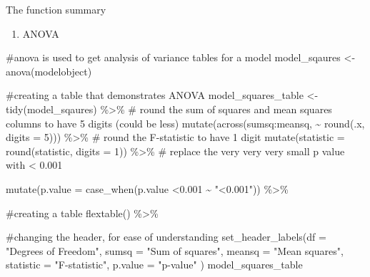 \documentclass[
  letterpaper,
  DIV=11,
  numbers=noendperiod]{scrartcl}
\newenvironment{Shaded}{\begin{snugshade}}{\end{snugshade}}
\newcommand{\AttributeTok}[1]{\textcolor[rgb]{0.40,0.45,0.13}{#1}}
\newcommand{\CommentTok}[1]{\textcolor[rgb]{0.37,0.37,0.37}{#1}}
\newcommand{\DecValTok}[1]{\textcolor[rgb]{0.68,0.00,0.00}{#1}}
\newcommand{\FloatTok}[1]{\textcolor[rgb]{0.68,0.00,0.00}{#1}}
\newcommand{\FunctionTok}[1]{\textcolor[rgb]{0.28,0.35,0.67}{#1}}
\newcommand{\NormalTok}[1]{\textcolor[rgb]{0.00,0.23,0.31}{#1}}
\newcommand{\OtherTok}[1]{\textcolor[rgb]{0.00,0.23,0.31}{#1}}
\newcommand{\SpecialCharTok}[1]{\textcolor[rgb]{0.37,0.37,0.37}{#1}}
\newcommand{\StringTok}[1]{\textcolor[rgb]{0.13,0.47,0.30}{#1}}
\providecommand{\tightlist}{%
  \setlength{\itemsep}{0pt}\setlength{\parskip}{0pt}}\usepackage{longtable,booktabs,array}
\begin{document}
The function summary

\begin{enumerate}
\def\labelenumi{\arabic{enumi}.}
\setcounter{enumi}{6}
\tightlist
\item
  ANOVA
\end{enumerate}

\begin{Shaded}
\begin{Highlighting}[]
\CommentTok{\#anova is used to get analysis of variance tables for a model }
\NormalTok{model\_sqaures }\OtherTok{\textless{}{-}} \FunctionTok{anova}\NormalTok{(modelobject)}
\end{Highlighting}
\end{Shaded}

\begin{Shaded}
\begin{Highlighting}[]
\CommentTok{\#creating a table that demonstrates ANOVA}
\NormalTok{model\_squares\_table }\OtherTok{\textless{}{-}}\FunctionTok{tidy}\NormalTok{(model\_sqaures) }\SpecialCharTok{\%\textgreater{}\%} 
  \CommentTok{\# round the sum of squares and mean squares columns to have 5 digits (could be less)}
  \FunctionTok{mutate}\NormalTok{(}\FunctionTok{across}\NormalTok{(sumsq}\SpecialCharTok{:}\NormalTok{meansq, }\SpecialCharTok{\textasciitilde{}} \FunctionTok{round}\NormalTok{(.x, }\AttributeTok{digits =} \DecValTok{5}\NormalTok{))) }\SpecialCharTok{\%\textgreater{}\%} 
  \CommentTok{\# round the F{-}statistic to have 1 digit}
  \FunctionTok{mutate}\NormalTok{(}\AttributeTok{statistic =} \FunctionTok{round}\NormalTok{(statistic, }\AttributeTok{digits =} \DecValTok{1}\NormalTok{)) }\SpecialCharTok{\%\textgreater{}\%} 
  \CommentTok{\# replace the very very very small p value with \textless{} 0.001}
  
  \FunctionTok{mutate}\NormalTok{(}\AttributeTok{p.value =} \FunctionTok{case\_when}\NormalTok{(p.value }\SpecialCharTok{\textless{}}\FloatTok{0.001} \SpecialCharTok{\textasciitilde{}} \StringTok{"\textless{}0.001"}\NormalTok{)) }\SpecialCharTok{\%\textgreater{}\%} 
  
  \CommentTok{\#creating a table }
  \FunctionTok{flextable}\NormalTok{() }\SpecialCharTok{\%\textgreater{}\%} 
  
  \CommentTok{\#changing the header, for ease of understanding }
  \FunctionTok{set\_header\_labels}\NormalTok{(}\AttributeTok{df =} \StringTok{"Degrees of Freedom"}\NormalTok{, }
                    \AttributeTok{sumsq =} \StringTok{"Sum of squares"}\NormalTok{,}
                    \AttributeTok{meansq =} \StringTok{"Mean squares"}\NormalTok{,}
                    \AttributeTok{statistic =} \StringTok{"F{-}statistic"}\NormalTok{,}
                    \AttributeTok{p.value =} \StringTok{"p{-}value"}
\NormalTok{                    )}
\NormalTok{model\_squares\_table}
\end{Highlighting}
\end{Shaded}
\end{document}
